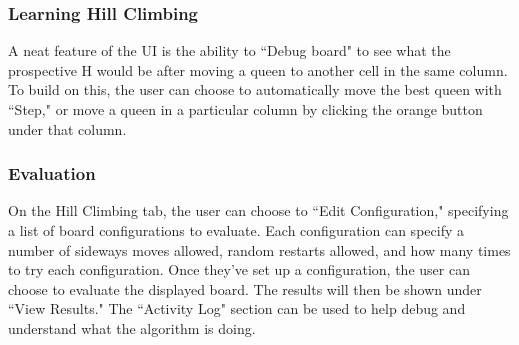 \subsubsection{Learning Hill Climbing}
A neat feature of the UI is the ability to ``Debug board" to see what the prospective H would be after moving a queen to
another cell in the same column. To build on this, the user can choose to automatically move the best queen with ``Step,"
or move a queen in a particular column by clicking the orange button under that column.

\subsubsection{Evaluation}
On the Hill Climbing tab, the user can choose to ``Edit Configuration," specifying a list of board configurations to
evaluate. Each configuration can specify a number of sideways moves allowed, random restarts allowed, and how many
times to try each configuration. Once they've set up a configuration, the user can choose to evaluate the displayed
board. The results will then be shown under ``View Results." The ``Activity Log" section can be used to help debug and
understand what the algorithm is doing.
